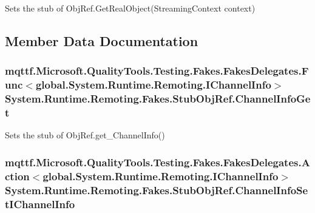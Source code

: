 Sets the stub of Obj\-Ref.\-Get\-Real\-Object(\-Streaming\-Context context)



\subsection{Member Data Documentation}
\hypertarget{class_system_1_1_runtime_1_1_remoting_1_1_fakes_1_1_stub_obj_ref_aed6ad5f5fc55e593ff4d4d01f72411f5}{
\subsubsection[{Channel\-Info\-Get}]{\setlength{\rightskip}{0pt plus 5cm}mqttf.\-Microsoft.\-Quality\-Tools.\-Testing.\-Fakes.\-Fakes\-Delegates.\-Func$<$global.\-System.\-Runtime.\-Remoting.\-I\-Channel\-Info$>$ System.\-Runtime.\-Remoting.\-Fakes.\-Stub\-Obj\-Ref.\-Channel\-Info\-Get}}\label{class_system_1_1_runtime_1_1_remoting_1_1_fakes_1_1_stub_obj_ref_aed6ad5f5fc55e593ff4d4d01f72411f5}


Sets the stub of Obj\-Ref.\-get\-\_\-\-Channel\-Info()

\hypertarget{class_system_1_1_runtime_1_1_remoting_1_1_fakes_1_1_stub_obj_ref_aabb153379661f77c33480d0de27fcb7c}{
\subsubsection[{Channel\-Info\-Set\-I\-Channel\-Info}]{\setlength{\rightskip}{0pt plus 5cm}mqttf.\-Microsoft.\-Quality\-Tools.\-Testing.\-Fakes.\-Fakes\-Delegates.\-Action$<$global.\-System.\-Runtime.\-Remoting.\-I\-Channel\-Info$>$ System.\-Runtime.\-Remoting.\-Fakes.\-Stub\-Obj\-Ref.\-Channel\-Info\-Set\-I\-Channel\-Info}}\label{class_system_1_1_runtime_1_1_remoting_1_1_fakes_1_1_stub_obj_ref_aabb153379661f77c33480d0de27fcb7c}


